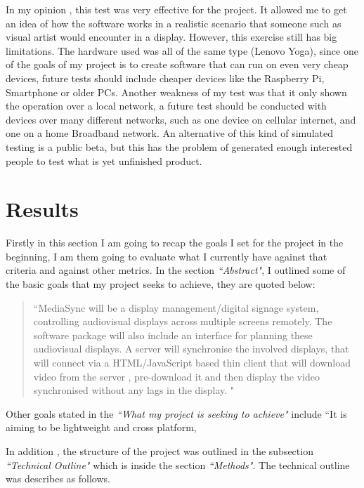 \documentclass{article}
\begin{document}
In my opinion , this test was very effective for the project. It allowed me to get an idea of how the software works in a realistic scenario that someone such as visual artist would encounter in a display. However, this exercise still has big limitations. The hardware used was all of the same type (Lenovo Yoga), since one of the goals of my project is to create software that can run on even very cheap devices, future tests should include cheaper devices like the Raspberry Pi, Smartphone or older PCs. Another weakness of my test was that it only shown the operation over a local network, a future test should be conducted with devices over many different networks, such as one device on cellular internet, and one on a home Broadband network. An alternative of this kind of simulated testing is a public beta, but this has the problem of generated enough interested people to test what is yet unfinished product. 





\section{Results}
Firstly in this section I am going to recap the goals I set for the project in the beginning, I am them going to evaluate what I currently have against that criteria and against other metrics.
In the section \textit{``Abstract"}, I outlined some of the basic goals that my project seeks to achieve, they are quoted below:
\begin{quote}
``MediaSync will be a display management/digital signage system, controlling audiovisual displays across multiple screens remotely. The software package will also include an interface for planning these audiovisual displays. A server will synchronise the involved displays, that will connect via a HTML/JavaScript based thin client that will download video from the server , pre-download it and then display the video synchronised without any lags in the display. "
\end{quote}

Other goals stated in the \textit{``What my project is seeking to achieve"} include ``It is aiming to be lightweight and cross platform,

In addition , the structure of the project was outlined in the subsection \textit{``Technical Outline"} which is inside the section \textit{``Methods"}. The technical outline was describes as follows.
\end{document}
